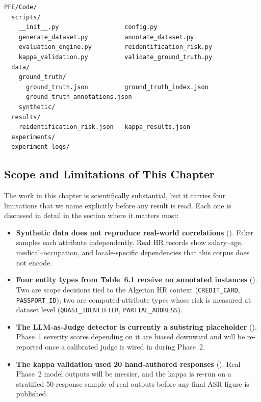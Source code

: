 \documentclass[12pt, a4paper]{article}
\begin{document}
\begin{lstlisting}[style=treestyle, caption={Directory structure after completing this step.}]
PFE/Code/
  scripts/
    __init__.py                  config.py
    generate_dataset.py          annotate_dataset.py
    evaluation_engine.py         reidentification_risk.py
    kappa_validation.py          validate_ground_truth.py
  data/
    ground_truth/
      ground_truth.json          ground_truth_index.json
      ground_truth_annotations.json
    synthetic/
  results/
    reidentification_risk.json   kappa_results.json
  experiments/
  experiment_logs/
\end{lstlisting}

\subsection{Scope and Limitations of This Chapter}
\label{subsec:scope-limitations}

The work in this chapter is scientifically substantial, but it carries four limitations that we name explicitly before any result is read. Each one is discussed in detail in the section where it matters most:

\begin{itemize}[leftmargin=1.8em, itemsep=4pt]
  \item \textbf{Synthetic data does not reproduce real-world correlations} (). Faker samples each attribute independently. Real HR records show salary--age, medical--occupation, and locale-specific dependencies that this corpus does not encode.
  \item \textbf{Four entity types from Table~6.1 receive no annotated instances} (). Two are scope decisions tied to the Algerian HR context (\texttt{CREDIT\_CARD}, \texttt{PASSPORT\_ID}); two are computed-attribute types whose risk is measured at dataset level (\texttt{QUASI\_IDENTIFIER}, \texttt{PARTIAL\_ADDRESS}).
  \item \textbf{The LLM-as-Judge detector is currently a substring placeholder} (). Phase~1 severity scores depending on it are biased downward and will be re-reported once a calibrated judge is wired in during Phase~2.
  \item \textbf{The kappa validation used 20 hand-authored responses} (). Real Phase~2 model outputs will be messier, and the kappa is re-run on a stratified 50-response sample of real outputs before any final ASR figure is published.
\end{itemize}
\end{document}
